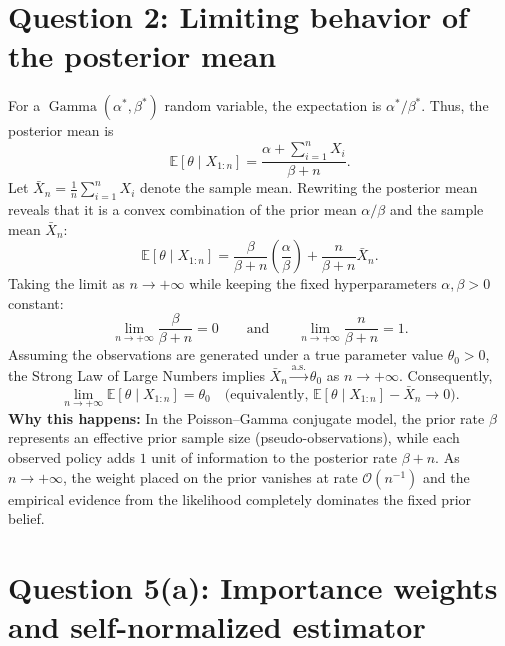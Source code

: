 \section*{Question 2: Limiting behavior of the posterior mean}

For a $\operatorname{Gamma}(\alpha^*, \beta^*)$ random variable, the expectation is $\alpha^* / \beta^*$. Thus, the posterior mean is
\[
\mathbb{E}[\theta \mid X_{1:n}]
= \frac{\alpha + \sum_{i=1}^{n} X_i}{\beta + n}.
\]
Let $\bar{X}_n = \frac{1}{n}\sum_{i=1}^{n} X_i$ denote the sample mean. Rewriting the posterior mean reveals that it is a convex combination of the prior mean $\alpha / \beta$ and the sample mean $\bar{X}_n$:
\[
\mathbb{E}[\theta \mid X_{1:n}]
= \frac{\beta}{\beta + n}\left(\frac{\alpha}{\beta}\right)
+ \frac{n}{\beta + n}\bar{X}_n.
\]
Taking the limit as $n \to +\infty$ while keeping the fixed hyperparameters $\alpha, \beta > 0$ constant:
\[
\lim_{n \to +\infty} \frac{\beta}{\beta + n} = 0
\qquad \text{and} \qquad
\lim_{n \to +\infty} \frac{n}{\beta + n} = 1.
\]
Assuming the observations are generated under a true parameter value $\theta_0 > 0$, the Strong Law of Large Numbers implies $\bar{X}_n \xrightarrow{\text{a.s.}} \theta_0$ as $n \to +\infty$. Consequently,
\[
\boxed{\lim_{n \to +\infty} \mathbb{E}[\theta \mid X_{1:n}] = \theta_0}
\quad \text{(equivalently, } \mathbb{E}[\theta \mid X_{1:n}] - \bar{X}_n \to 0\text{).}
\]
\textbf{Why this happens:} In the Poisson--Gamma conjugate model, the prior rate $\beta$ represents an effective prior sample size (pseudo-observations), while each observed policy adds $1$ unit of information to the posterior rate $\beta + n$. As $n \to +\infty$, the weight placed on the prior vanishes at rate $\mathcal{O}(n^{-1})$ and the empirical evidence from the likelihood completely dominates the fixed prior belief.

\section*{Question 5(a): Importance weights and self-normalized estimator}

